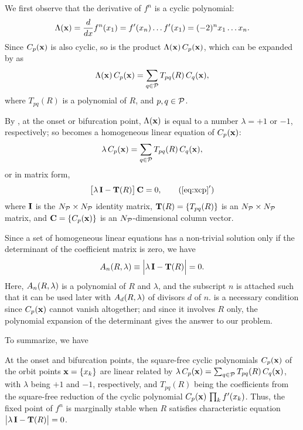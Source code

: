 \documentclass[twocolumn]{revtex4-1}
\begin{document}
We first observe that the derivative of $f^n$
is a cyclic polynomial:
%
%
\begin{equation}
  \Lambda(\mathbf{x})
   = \frac{d}{dx}f^{n}(x_1)
   = f'(x_n) \dots f'(x_1)
   = (-2)^n x_1 \dots x_n.
\label{eq:logder}
\end{equation}
%
%
Since $C_p(\mathbf{x})$ is also cyclic,
  so is the product $\Lambda(\mathbf{x}) \, C_p(\mathbf{x})$,
  which can be expanded by  as
\begin{equation}
  \Lambda(\mathbf{x}) \, C_p(\mathbf{x}) = \sum_{q \in \mathcal P} T_{pq}(R) \, C_q(\mathbf{x}),
\label{eq:xcp0}
\end{equation}
where $T_{pq}(R)$ is a polynomial of $R$,
and $p, q \in \mathcal P$.



By , at the onset or bifurcation point,
  $\Lambda(\mathbf{x})$ is equal to a number
  $\lambda = +1$ or $-1$, respectively;
  so 
  becomes a homogeneous linear equation of
  $C_p(\mathbf{x})$:
\begin{equation}
  \lambda \, C_p(\mathbf{x}) = \sum_{q \in \mathcal P} T_{pq}(R) \, C_q(\mathbf{x}),
\label{eq:xcp}
\end{equation}
%
%
or in matrix form,
\begin{equation}
  \big[ \lambda \, \vct I - \vct T(R) \big] \, \vct C = 0,
\tag{$\ref{eq:xcp}'$}
\end{equation}
%
%
where
$\mathbf{I}$ is the $N_\mathcal P \times N_\mathcal P$ identity matrix,
$\mathbf{T}(R) = \{T_{pq}(R)\}$ is an $N_\mathcal P \times N_\mathcal P$ matrix,
and
$\mathbf{C} = \{C_p(\mathbf{x})\}$ is an $N_\mathcal P$-dimensional column vector.




Since a set of homogeneous linear equations
  has a non-trivial solution
  only if the determinant of the coefficient matrix
  is zero, we have
\begin{equation}
  A_n(R, \lambda) \equiv \Big| \lambda \, \mathbf{I} - \mathbf{T}(R) \Big| = 0.
\label{eq:xr}
\end{equation}
Here, $A_n(R, \lambda)$ is a polynomial of $R$ and $\lambda$,
  and the subscript $n$ is attached such that
  it can be used later with $A_d(R, \lambda)$ of divisors $d$ of $n$.
 is a necessary condition
  since $C_p(\mathbf{x})$ cannot vanish altogether;
and since it involves $R$ only,
  the polynomial expansion of the determinant
  gives the answer to our problem.


To summarize, we have
\begin{theorem}
  At the onset and bifurcation points,
  the square-free cyclic polynomials $C_p(\mathbf{x})$
  of the orbit points $\mathbf{x} = \{x_k\}$
  are linear related by %
  $\lambda \, C_p(\mathbf{x}) = \sum_{q \in \mathcal P} T_{pq}(R) \, C_q(\mathbf{x})$,
  with $\lambda$ being $+1$ and $-1$, respectively,
  and $T_{pq}(R)$ being the coefficients
  from the square-free reduction of the cyclic polynomial
  $C_p(\mathbf{x}) \, \prod_k f'(x_k)$. %
  Thus, the fixed point of $f^n$
  is marginally stable when $R$ satisfies
  characteristic equation $\big| \lambda \, \mathbf{I} - \mathbf{T}(R) \big| = 0$.
  \label{thm:main}
\end{theorem}
\end{document}
